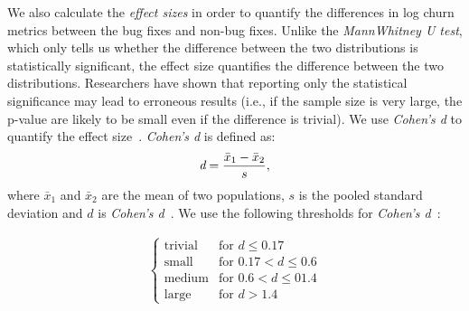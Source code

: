 
We also calculate the {\em effect sizes} in order to quantify the differences in log churn metrics between the bug fixes and non-bug fixes. Unlike the {\em MannWhitney U test}, which only tells us whether the difference between the two distributions is statistically significant, the effect size quantifies the difference between the two distributions. Researchers have shown that reporting only the statistical significance may lead to erroneous results (i.e., if the sample size is very large, the p-value are likely to be small even if the difference is trivial). We use {\em Cohen's d} to quantify the effect size~\cite{cohenUsage1,cohenUsage2}. {\em Cohen's d} is defined as:
\begin{equation} \text{{\em d}} = \frac{\bar{x}_1 - \bar{x}_2}{s},
\label{eq:cohensd}
\end{equation}
where $\bar{x}_1$ and $\bar{x}_2$ are the mean of two populations, $s$ is the pooled standard deviation and $d$ is \emph{Cohen's d}~\cite{shadish2009combining}. We use the following thresholds for {\em Cohen's d}~\cite{Effectsize}:

 \begin{align}\label{cohens-d_interpretation-se}
\begin{cases}
\text{trivial}		& \text{for $d \le 0.17$}		\\
\text{small}		& \text{for $0.17 < d \le 0.6$}	\\
\text{medium}	& \text{for $0.6 < d \le 01.4$}	\\
\text{large}		& \text{for $d > 1.4$}
\end{cases}
\end{align}




